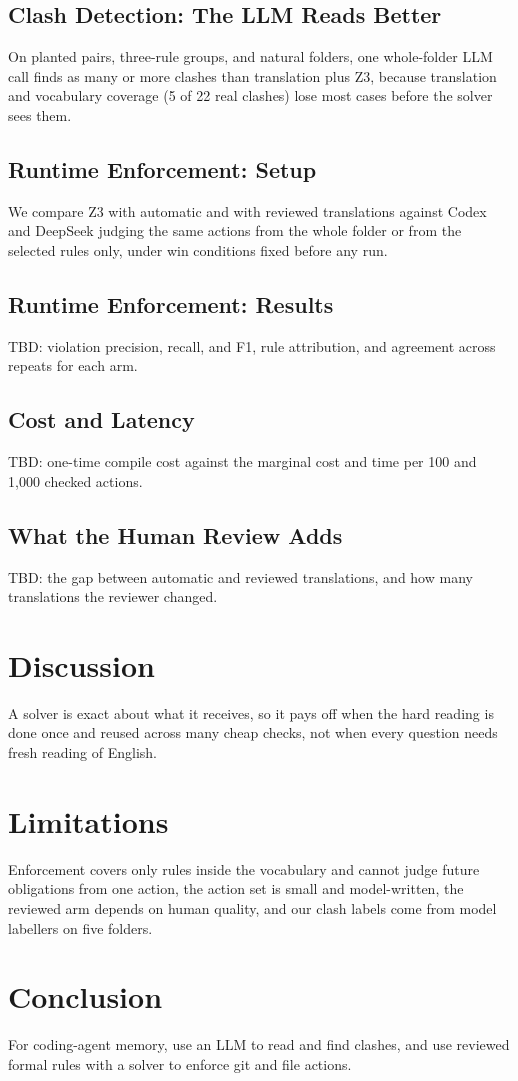 \documentclass[11pt]{article}
\begin{document}
\subsection{Clash Detection: The LLM Reads Better}
On planted pairs, three-rule groups, and natural folders, one whole-folder LLM call finds as
many or more clashes than translation plus Z3, because translation and vocabulary coverage
(5 of 22 real clashes) lose most cases before the solver sees them.
\subsection{Runtime Enforcement: Setup}
We compare Z3 with automatic and with reviewed translations against Codex and DeepSeek judging
the same actions from the whole folder or from the selected rules only, under win conditions
fixed before any run.
\subsection{Runtime Enforcement: Results}
TBD: violation precision, recall, and F1, rule attribution, and agreement across repeats for
each arm.
\subsection{Cost and Latency}
TBD: one-time compile cost against the marginal cost and time per 100 and 1,000 checked actions.
\subsection{What the Human Review Adds}
TBD: the gap between automatic and reviewed translations, and how many translations the
reviewer changed.

\section{Discussion}
A solver is exact about what it receives, so it pays off when the hard reading is done once
and reused across many cheap checks, not when every question needs fresh reading of English.

\section{Limitations}
Enforcement covers only rules inside the vocabulary and cannot judge future obligations from one
action, the action set is small and model-written, the reviewed arm depends on human quality,
and our clash labels come from model labellers on five folders.

\section{Conclusion}
For coding-agent memory, use an LLM to read and find clashes, and use reviewed formal rules
with a solver to enforce git and file actions.
\end{document}

